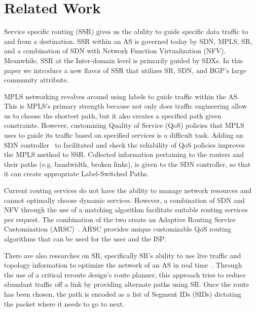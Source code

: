 

\section{Related Work}
\label{sec:related}
Service specific routing (SSR) gives us the ability to guide specific data traffic to and from a destination. SSR within an AS is governed today by SDN, MPLS, SR, and a combination of SDN with Network Function Virtualization (NFV). Meanwhile, SSR at the Inter-domain level is primarily guided by SDXs. In this paper we introduce a new flavor of SSR that utilizes SR, SDN, and BGP's large community attribute. 

MPLS networking revolves around using labels to guide traffic within the AS. This is MPLS’s primary strength because not only does traffic engineering allow us to choose the shortest path, but it also creates a specified path given constraints. However, customizing Quality of Service (QoS) policies that MPLS uses to guide its traffic based on specified services is a difficult task. Adding an SDN controller~\cite{MPLSSDN} to facilitated and check the reliability of QoS policies improves the MPLS method to SSR. Collected information pertaining to the routers and their paths (e.g. bandwidth, broken links), is given to the SDN controller, so that it can create appropriate Label-Switched Paths.

Current routing services do not have the ability to manage network resources and cannot optimally choose dynamic services. However, a combination of SDN and NFV through the use of a matching algorithm facilitate suitable routing services per request. The combination of the two create an Adaptive Routing Service Customization (ARSC)~\cite{SDNNFV}. ARSC provides unique customizable QoS routing algorithms that can be used for the user and the ISP. 

There are also researches on SR, specifically SR’s ability to use live traffic and topology information to optimize the network of an AS in real time~\cite{SRR}. Through the use of a critical reroute design’s route planner, this approach tries to reduce abundant traffic off a link by providing alternate paths using SR. Once the route has been chosen, the path is encoded as a list of Segment IDs (SIDs) dictating the packet where it needs to go to next. 

